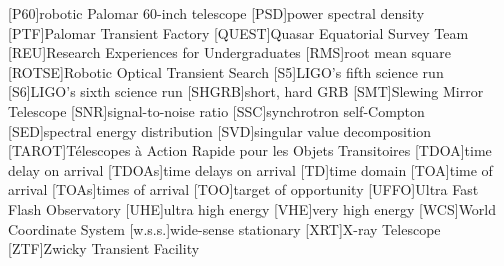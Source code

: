 \begin{acronym}
[P60]{robotic Palomar 60\nobreakdashes-inch telescope}
[PSD]{power spectral density}
[PTF]{Palomar Transient Factory}
[QUEST]{Quasar Equatorial Survey Team}
[REU]{Research Experiences for Undergraduates}
[RMS]{root mean square}
[ROTSE]{Robotic Optical Transient Search}
[S5]{\ac{LIGO}'s fifth science run}
[S6]{\ac{LIGO}'s sixth science run}
[SHGRB]{short, hard \acl{GRB}}
[SMT]{Slewing Mirror Telescope}
[SNR]{signal\nobreakdashes-to\nobreakdashes-noise ratio}
[SSC]{synchrotron self\nobreakdashes-Compton}
[SED]{spectral energy distribution}
[SVD]{singular value decomposition}
[TAROT]{T\'{e}lescopes \`{a} Action Rapide pour les Objets Transitoires}
[TDOA]{time delay on arrival}
[TDOAs]{time delays on arrival}
[TD]{time domain}
[TOA]{time of arrival}
[TOAs]{times of arrival}
[TOO]{target of opportunity}
[UFFO]{Ultra Fast Flash Observatory}
[UHE]{ultra high energy}
[VHE]{very high energy}
[WCS]{World Coordinate System}
[w.s.s.]{wide\nobreakdashes-sense stationary}
[XRT]{X\nobreakdashes-ray Telescope}
[ZTF]{Zwicky Transient Facility}
\end{acronym}
